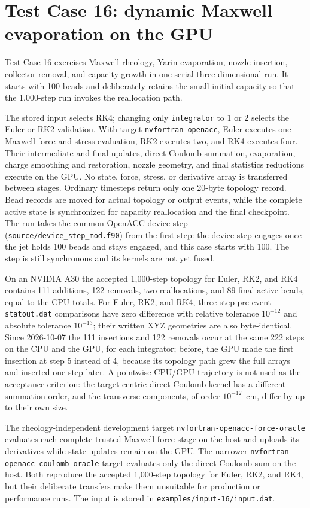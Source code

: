 \section{Test Case 16: dynamic Maxwell evaporation on the GPU}

Test Case 16 exercises Maxwell rheology, Yarin evaporation, nozzle insertion,
collector removal, and capacity growth in one serial three-dimensional run.
It starts with 100 beads and deliberately retains the small initial capacity
so that the 1,000-step run invokes the reallocation path.

The stored input selects RK4; changing only \texttt{integrator} to 1 or 2
selects the Euler or RK2 validation.  With target
\texttt{nvfortran-openacc}, Euler executes one Maxwell force and stress
evaluation, RK2 executes two, and RK4 executes four.  Their intermediate and
final updates, direct Coulomb summation, evaporation, charge smoothing and
restoration, nozzle geometry, and final statistics reductions execute on the
GPU.  No state, force, stress, or derivative array is transferred between
stages.  Ordinary timesteps return only one 20-byte topology record.  Bead
records are moved for actual topology or output events, while the complete
active state is synchronized for capacity reallocation and the final
checkpoint.  The run takes the common OpenACC device step
(\texttt{source/device\_step\_mod.f90}) from the first step: the device step
engages once the jet holds 100 beads and stays engaged, and this case starts
with 100.  The step is still synchronous and its kernels are not yet fused.

On an NVIDIA A30 the accepted 1,000-step topology for Euler, RK2, and RK4
contains 111 additions, 122 removals, two reallocations, and 89 final active
beads, equal to the CPU totals.  For Euler, RK2, and RK4, three-step pre-event
\texttt{statout.dat} comparisons have zero difference with relative tolerance
$10^{-12}$ and absolute tolerance $10^{-13}$; their written XYZ geometries are
also byte-identical.  Since 2026-10-07 the 111 insertions and 122 removals
occur at the same 222 steps on the CPU and the GPU, for each integrator;
before, the GPU made the first insertion at step 5 instead of 4, because its
topology path grew the full arrays and inserted one step later.  A pointwise
CPU/GPU trajectory is not used as the acceptance criterion: the
target-centric direct Coulomb kernel has a different summation order, and
the transverse components, of order $10^{-12}$~cm, differ by up to their own
size.

The rheology-independent development target
\texttt{nvfortran-openacc-force-oracle} evaluates each complete trusted
Maxwell force stage on the host and uploads its derivatives while state
updates remain on the GPU.  The narrower
\texttt{nvfortran-openacc-coulomb-oracle} target evaluates only the direct
Coulomb sum on the host. Both reproduce the accepted 1,000-step topology for
Euler, RK2, and RK4, but their deliberate transfers make them unsuitable for
production or performance runs. The input is stored in
\texttt{examples/input-16/input.dat}.

